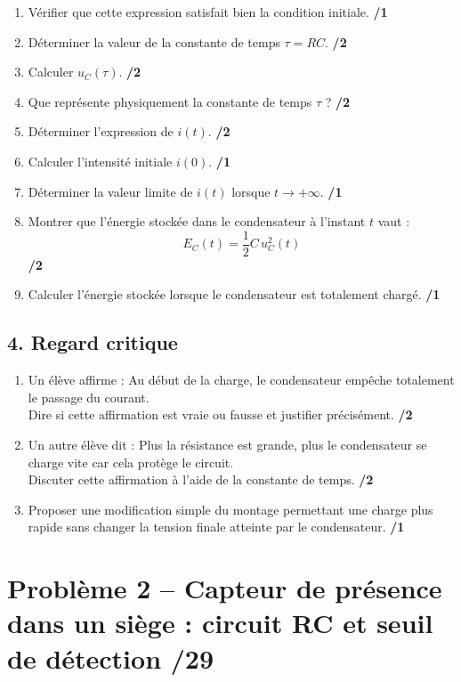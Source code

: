 \documentclass[11pt,a4paper]{article}
\begin{document}
\begin{enumerate}
    \item Vérifier que cette expression satisfait bien la condition initiale. \hfill \textbf{/1}
    \item Déterminer la valeur de la constante de temps \(\tau = RC\). \hfill \textbf{/2}
    \item Calculer \(u_C(\tau)\). \hfill \textbf{/2}
    \item Que représente physiquement la constante de temps \(\tau\) ? \hfill \textbf{/2}
    \item Déterminer l'expression de \(i(t)\). \hfill \textbf{/2}
    \item Calculer l'intensité initiale \(i(0)\). \hfill \textbf{/1}
    \item Déterminer la valeur limite de \(i(t)\) lorsque \(t\to +\infty\). \hfill \textbf{/1}
    \item Montrer que l'énergie stockée dans le condensateur à l'instant \(t\) vaut :
    \[
    E_C(t)=\frac12 C\,u_C^2(t)
    \]
    \hfill \textbf{/2}
    \item Calculer l'énergie stockée lorsque le condensateur est totalement chargé. \hfill \textbf{/1}
\end{enumerate}

\subsection*{4. Regard critique}
\begin{enumerate}
    \item Un élève affirme : \og Au début de la charge, le condensateur empêche totalement le passage du courant. \fg \\
    Dire si cette affirmation est vraie ou fausse et justifier précisément. \hfill \textbf{/2}
    \item Un autre élève dit : \og Plus la résistance est grande, plus le condensateur se charge vite car cela protège le circuit. \fg \\
    Discuter cette affirmation à l'aide de la constante de temps. \hfill \textbf{/2}
    \item Proposer une modification simple du montage permettant une charge plus rapide sans changer la tension finale atteinte par le condensateur. \hfill \textbf{/1}
\end{enumerate}

\vspace{1em}

\section*{Problème 2 -- Capteur de présence dans un siège : circuit RC et seuil de détection \hfill /29}
\end{document}
